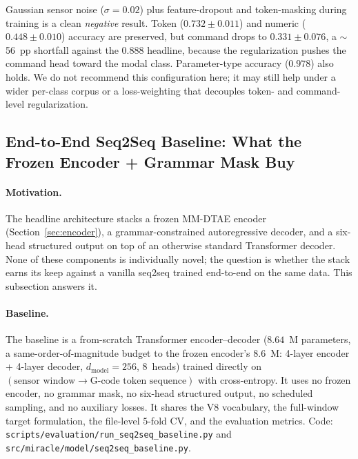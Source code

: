 \documentclass[sensors,article,submit,moreauthors,pdftex]{Definitions/mdpi}
\begin{document}
Gaussian sensor noise ($\sigma=0.02$) plus feature-dropout and token-masking during training is a clean \emph{negative} result. Token ($0.732 \pm 0.011$) and numeric ($0.448 \pm 0.010$) accuracy are preserved, but command drops to $0.331 \pm 0.076$, a $\sim$56~pp shortfall against the $0.888$ headline, because the regularization pushes the command head toward the modal class. Parameter-type accuracy ($0.978$) also holds. We do not recommend this configuration here; it may still help under a wider per-class corpus or a loss-weighting that decouples token- and command-level regularization.

\subsection{End-to-End Seq2Seq Baseline: What the Frozen Encoder + Grammar Mask Buy}
\label{sec:abl-seq2seq-baseline}

\paragraph{Motivation.} The headline architecture stacks a frozen MM-DTAE encoder (Section~\ref{sec:encoder}), a grammar-constrained autoregressive decoder, and a six-head structured output on top of an otherwise standard Transformer decoder. None of these components is individually novel; the question is whether the stack earns its keep against a vanilla seq2seq trained end-to-end on the same data. This subsection answers it.

\paragraph{Baseline.} The baseline is a from-scratch Transformer encoder--decoder ($8.64$~M parameters, a same-order-of-magnitude budget to the frozen encoder's $8.6$~M: 4-layer encoder + 4-layer decoder, $d_{\text{model}}\!=\!256$, $8$~heads) trained directly on $(\text{sensor window}\!\to\!\text{G-code token sequence})$ with cross-entropy. It uses no frozen encoder, no grammar mask, no six-head structured output, no scheduled sampling, and no auxiliary losses. It shares the V8 vocabulary, the full-window target formulation, the file-level $5$-fold CV, and the evaluation metrics. Code: \texttt{scripts/evaluation/run\_seq2seq\_baseline.py} and \texttt{src/miracle/model/seq2seq\_baseline.py}.
\end{document}
